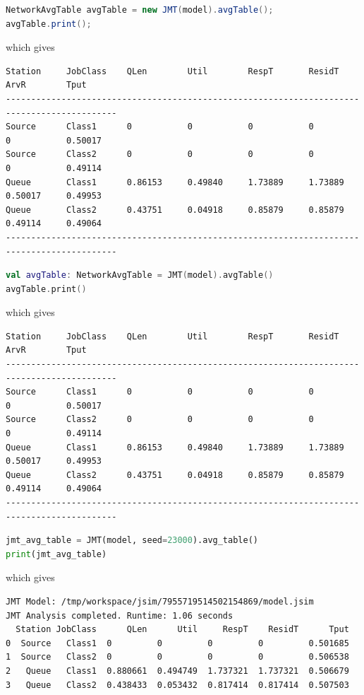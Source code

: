 \begin{JAVA}
\begin{lstlisting}[language = java, basicstyle=\ttfamily\scriptsize]
NetworkAvgTable avgTable = new JMT(model).avgTable();
avgTable.print();
\end{lstlisting}
which gives
\begin{lstlisting}[basicstyle=\ttfamily\scriptsize]
Station   	JobClass  	QLen      	Util      	RespT     	ResidT    	ArvR      	Tput      
--------------------------------------------------------------------------------------------
Source    	Class1    	0          	0          	0          	0          	0          	0.50017   
Source    	Class2    	0          	0          	0          	0          	0          	0.49114   
Queue     	Class1    	0.86153   	0.49840   	1.73889   	1.73889   	0.50017   	0.49953   
Queue     	Class2    	0.43751   	0.04918   	0.85879   	0.85879   	0.49114   	0.49064   
--------------------------------------------------------------------------------------------
\end{lstlisting}
\end{JAVA}
\begin{KOTLIN}
\begin{lstlisting}[language = kotlin, basicstyle=\ttfamily\scriptsize]
val avgTable: NetworkAvgTable = JMT(model).avgTable()
avgTable.print()
\end{lstlisting}
which gives
\begin{lstlisting}[basicstyle=\ttfamily\scriptsize]
Station   	JobClass  	QLen      	Util      	RespT     	ResidT    	ArvR      	Tput      
--------------------------------------------------------------------------------------------
Source    	Class1    	0          	0          	0          	0          	0          	0.50017   
Source    	Class2    	0          	0          	0          	0          	0          	0.49114   
Queue     	Class1    	0.86153   	0.49840   	1.73889   	1.73889   	0.50017   	0.49953   
Queue     	Class2    	0.43751   	0.04918   	0.85879   	0.85879   	0.49114   	0.49064   
--------------------------------------------------------------------------------------------
\end{lstlisting}
\end{KOTLIN}
\begin{PYTHON}
\begin{lstlisting}[language = python]
jmt_avg_table = JMT(model, seed=23000).avg_table()
print(jmt_avg_table)
\end{lstlisting}
which gives
\begin{lstlisting}[basicstyle=\ttfamily\scriptsize]
JMT Model: /tmp/workspace/jsim/7955719514502154869/model.jsim
JMT Analysis completed. Runtime: 1.06 seconds
  Station JobClass      QLen      Util     RespT    ResidT      Tput
0  Source   Class1  0         0         0         0         0.501685
1  Source   Class2  0         0         0         0         0.506538
2   Queue   Class1  0.880661  0.494749  1.737321  1.737321  0.506679
3   Queue   Class2  0.438433  0.053432  0.817414  0.817414  0.507503
\end{lstlisting}
\end{PYTHON}
